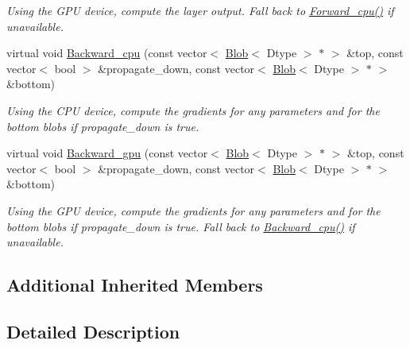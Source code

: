 \begin{DoxyCompactItemize}
\begin{DoxyCompactList}\small\item\em Using the G\+PU device, compute the layer output. Fall back to \hyperlink{classcaffe_1_1BiasLayer_a168a9381f352e88e62ca7dd12f1bdfb3}{Forward\+\_\+cpu()} if unavailable. \end{DoxyCompactList}\item 
virtual void \hyperlink{classcaffe_1_1BiasLayer_a9819c2cf6246b2859fce9c09ca88ca5f}{Backward\+\_\+cpu} (const vector$<$ \hyperlink{classcaffe_1_1Blob}{Blob}$<$ Dtype $>$ $\ast$ $>$ \&top, const vector$<$ bool $>$ \&propagate\+\_\+down, const vector$<$ \hyperlink{classcaffe_1_1Blob}{Blob}$<$ Dtype $>$ $\ast$ $>$ \&bottom)\hypertarget{classcaffe_1_1BiasLayer_a9819c2cf6246b2859fce9c09ca88ca5f}{}\label{classcaffe_1_1BiasLayer_a9819c2cf6246b2859fce9c09ca88ca5f}

\begin{DoxyCompactList}\small\item\em Using the C\+PU device, compute the gradients for any parameters and for the bottom blobs if propagate\+\_\+down is true. \end{DoxyCompactList}\item 
virtual void \hyperlink{classcaffe_1_1BiasLayer_acbfdf36db670c4b472763a08dfee2afb}{Backward\+\_\+gpu} (const vector$<$ \hyperlink{classcaffe_1_1Blob}{Blob}$<$ Dtype $>$ $\ast$ $>$ \&top, const vector$<$ bool $>$ \&propagate\+\_\+down, const vector$<$ \hyperlink{classcaffe_1_1Blob}{Blob}$<$ Dtype $>$ $\ast$ $>$ \&bottom)\hypertarget{classcaffe_1_1BiasLayer_acbfdf36db670c4b472763a08dfee2afb}{}\label{classcaffe_1_1BiasLayer_acbfdf36db670c4b472763a08dfee2afb}

\begin{DoxyCompactList}\small\item\em Using the G\+PU device, compute the gradients for any parameters and for the bottom blobs if propagate\+\_\+down is true. Fall back to \hyperlink{classcaffe_1_1BiasLayer_a9819c2cf6246b2859fce9c09ca88ca5f}{Backward\+\_\+cpu()} if unavailable. \end{DoxyCompactList}\end{DoxyCompactItemize}
\subsection*{Additional Inherited Members}


\subsection{Detailed Description}
